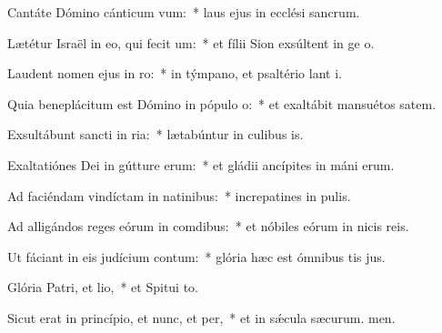 \item Cantáte Dómino cánticum vum:~* laus ejus in ecclési sancrum.
\item Lætétur Israël in eo, qui fecit um:~* et fílii Sion exsúltent in ge o.
\item Laudent nomen ejus in ro:~* in týmpano, et psaltério lant i.
\item Quia beneplácitum est Dómino in pópulo o:~* et exaltábit mansuétos  satem.
\item Exsultábunt sancti in ria:~* lætabúntur in culibus is.
\item Exaltatiónes Dei in gútture erum:~* et gládii ancípites in máni erum.
\item Ad faciéndam vindíctam in natinibus:~* increpatines in pulis.
\item Ad alligándos reges eórum in comdibus:~* et nóbiles eórum in nicis reis.
\item Ut fáciant in eis judícium contum:~* glória hæc est ómnibus tis jus.
\item Glória Patri, et lio,~* et Spitui to.
\item Sicut erat in princípio, et nunc, et per,~* et in sǽcula sæcurum. men.
